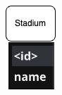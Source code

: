 \documentclass{Configuration_Files/PoliMi3i_thesis}
\begin{document}
\begin{figure}[htbp]
\begin{subfigure}[b]{0.12\linewidth}
    \includegraphics[width=\linewidth]{Project Template/Images/entities/stad.drawio.png}
  \end{subfigure}
  \hfill
  \begin{subfigure}[b]{0.2\linewidth}

\end{subfigure}
\end{figure}
\end{document}
